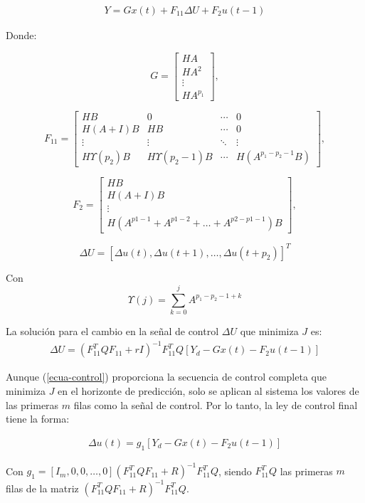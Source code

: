 \documentclass[journal]{IEEEtran}
\begin{document}
\begin{align}
Y = Gx(t) + F_{11} \Delta U + F_2 u(t - 1)
\end{align}

Donde:

\[
G = 
\begin{bmatrix}
HA \\
HA^2 \\
\vdots \\
HA^{p_1}
\end{bmatrix},
\]

\[
F_{11} = \begin{bmatrix}
    HB & 0 & \cdots & 0 \\
    H(A + I)B & HB & \cdots & 0 \\
    \vdots & \vdots & \ddots & \vdots \\
    H\varUpsilon(p_2)B & H\varUpsilon(p_2 - 1)B & \cdots & H(A^{p_1 - p_2 - 1}B)
\end{bmatrix},
\]

\[
F_2 = \begin{bmatrix}
    HB \\
    H(A + I)B \\
    \vdots \\
    H(A^{p1 - 1} + A^{p1 - 2} + \ldots + A^{p2 - p1 - 1})B
\end{bmatrix},
\]

\[
\Delta U = [\Delta u(t), \Delta u(t + 1), \ldots, \Delta u(t + p_2)]^T
\]

Con \[
\varUpsilon(j) = \sum_{k=0}^{j} A^{p_{1} - p_{2} - 1 + k}
\]


La solución para el cambio en la señal de control \( \Delta U \) que minimiza \( J \) es:
\begin{align}\label{ecua-control}
\Delta U = (F_{11}^T Q F_{11} + rI)^{-1} F_{11}^T Q \left[Y_d - Gx(t) - F_2 u(t - 1)\right]
\end{align}

Aunque (\ref{ecua-control}) proporciona la secuencia de control completa que minimiza \( J \) en el horizonte de predicción, solo se aplican al sistema los valores de las primeras \( m \) filas como la señal de control. Por lo tanto, la ley de control final tiene la forma:

\begin{align}
\Delta u(t) = g_1 [Y_d - Gx(t) - F_2u(t - 1)]
\end{align}

Con \( g_1 = \left[ I_m, 0, 0, \ldots, 0 \right] \left( F_{11}^T Q F_{11} + R \right)^{-1} F_{11}^T Q \), siendo \( F_{11}^T Q \) las primeras \( m \) filas de la matriz \( \left( F_{11}^T Q F_{11} + R \right)^{-1} F_{11}^T Q \). \\
\end{document}
